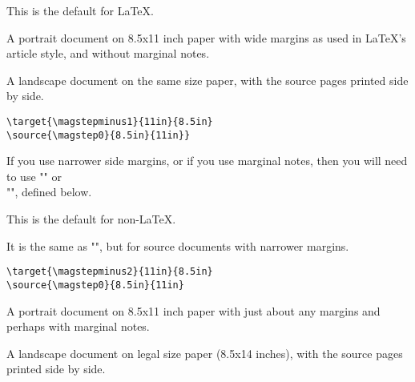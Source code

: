 \documentclass[12pt]{article}
\newcommand\namelistlabel[1]{\mbox{\bf #1}\hfil}
\newenvironment{namelist}[1]%
  {\begin{list}{}%
    {\let\makelabel\namelistlabel
    \settowidth{\labelwidth}{#1}
    \setlength{\leftmargin}{1.1\labelwidth}}}%
 {\end{list}}
\begin{document}
\begin{description}

\item [$\setminus$twouparticle]

This is the default for \LaTeX.
\begin{namelist}{Sourcexx}

\item [Source:] A portrait document on 8.5x11 inch paper with wide margins as
used in \LaTeX's article style, and without marginal notes.

\item [Target:] A landscape document on the same size paper, with the source
pages printed side by side.

\item [Definition:]\hspace{1pt}
\begin{verbatim}
\target{\magstepminus1}{11in}{8.5in}
\source{\magstep0}{8.5in}{11in}}
\end{verbatim}
\end{namelist}

If you use narrower side margins, or if you use marginal notes, then you
will need to use "\twoupplain" or \\ "\twouplegaltarget", defined below.

\item [$\setminus$twoupplain]

This is the default for non-\LaTeX.

It is the same as "\twouparticle", but for source documents with narrower
margins.
\begin{namelist}{Sourcexxx}

\item [Definition:]\hspace{1pt}
\begin{verbatim}
\target{\magstepminus2}{11in}{8.5in}
\source{\magstep0}{8.5in}{11in}
\end{verbatim}
\end{namelist}

\item [$\setminus$twouplegaltarget]

\begin{namelist}{Sourcexxx}
\item [Source:] A portrait document on 8.5x11 inch paper with just about any
margins and perhaps with marginal notes.

\item [Target:] A landscape document on legal size paper (8.5x14 inches),
with the source pages printed side by side.


\end{namelist}
\end{description}
\end{document}
